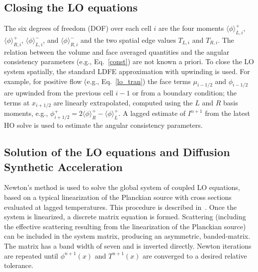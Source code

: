 \documentclass[11pt]{article}
\newcommand{\mom}[1]{\langle #1 \rangle}
\begin{document}
\subsection{Closing the LO equations}

The six degrees of freedom (DOF) over each cell $i$ are the four moments $\mom{\phi}_{L,i}^+$,
$\mom{\phi}_{R,i}^+$, $\mom{\phi}_{L,i}^-$, and $\mom{\phi}_{R,i}^-$ and the two
spatial edge values $T_{L,i}$ and $T_{R,i}$. The relation between the volume and face averaged quantities and the angular consistency parameters (e.g., Eq.~\eqref{const}) are not known a priori. 
To close the LO system spatially, the standard LDFE approximation with upwinding is
used.  For example, for positive flow (e.g., Eq.~\eqref{lo_tran}) the face terms $\mu_{i-1/2}$ and $\phi_{i-1/2}$
are upwinded from the previous cell $i-1$ or from a boundary condition; the terms
at $x_{i+1/2}$ are linearly extrapolated, computed using the $L$ and $R$ basis
moments, e.g., $\phi^+_{i+1/2} = 2\mom{\phi}_R^+ - \mom{\phi}_L^+$. 
A lagged estimate of $I^{n+1}$ from the latest HO solve is
used to estimate the angular consistency parameters. 

\subsection{Solution of the LO equations and Diffusion Synthetic Acceleration}
\label{sec:lo_sol}

Newton's method is used to solve the global system of coupled LO
equations, based on a typical linearization of the Planckian source with cross
sections evaluated at lagged temperatures.  This procedure is described
in~\cite{morel_newton}. 
Once the system is linearized, a discrete matrix equation is formed.  Scattering
(including the effective scattering resulting from the linearization of the
Planckian source) can
be included in the system matrix, producing an asymmetric, banded-matrix.  The matrix
has a band width of seven and is inverted directly.
Newton iterations are repeated until $\phi^{n+1}(x)$ and $T^{n+1}(x)$ are converged
to a desired relative tolerance. 
\end{document}
